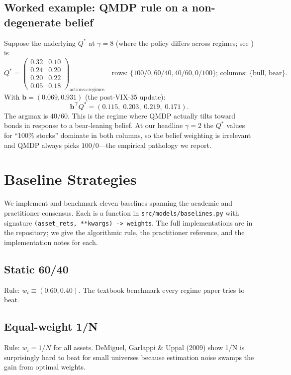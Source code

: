 \documentclass[11pt]{article}
\theoremstyle{plain1}
\theoremstyle{definition1}
\newcommand{\1}{\mathbf{1}}
\newcommand{\bel}{\mathbf{b}}
\begin{document}
\subsection{Worked example: QMDP rule on a non-degenerate belief}

Suppose the underlying $Q^\ast$ at $\gamma = 8$ (where the policy differs across regimes; see ) is
\[
Q^\ast = \begin{pmatrix} 0.32 & 0.10 \\ 0.24 & 0.20 \\ 0.20 & 0.22 \\ 0.05 & 0.18 \end{pmatrix}_{\text{actions} \times \text{regimes}}
\quad\text{rows: }\{100/0, 60/40, 40/60, 0/100\}\text{; columns: }\{\text{bull, bear}\}.
\]
With $\bel = (0.069, 0.931)$ (the post-VIX-35 update):
\[
\bel^\top Q^\ast = (0.115,\; 0.203,\; \mathbf{0.219},\; 0.171).
\]
The argmax is $40/60$. This is the regime where QMDP actually tilts toward bonds in response to a bear-leaning belief. At our headline $\gamma = 2$ the $Q^\ast$ values for ``100\% stocks'' dominate in both columns, so the belief weighting is irrelevant and QMDP always picks $100/0$---the empirical pathology we report.

\section{Baseline Strategies}\label{sec:baselines}

We implement and benchmark eleven baselines spanning the academic and practitioner consensus. Each is a function in \texttt{src/models/baselines.py} with signature \texttt{(asset\_rets, **kwargs) -> weights}. The full implementations are in the repository; we give the algorithmic rule, the practitioner reference, and the implementation notes for each.

\subsection{Static 60/40}
Rule: $w_t \equiv (0.60, 0.40)$. The textbook benchmark every regime paper tries to beat.

\subsection{Equal-weight 1/N}
Rule: $w_i = 1/N$ for all assets. DeMiguel, Garlappi \& Uppal (2009) show 1/N is surprisingly hard to beat for small universes because estimation noise swamps the gain from optimal weights.
\end{document}
